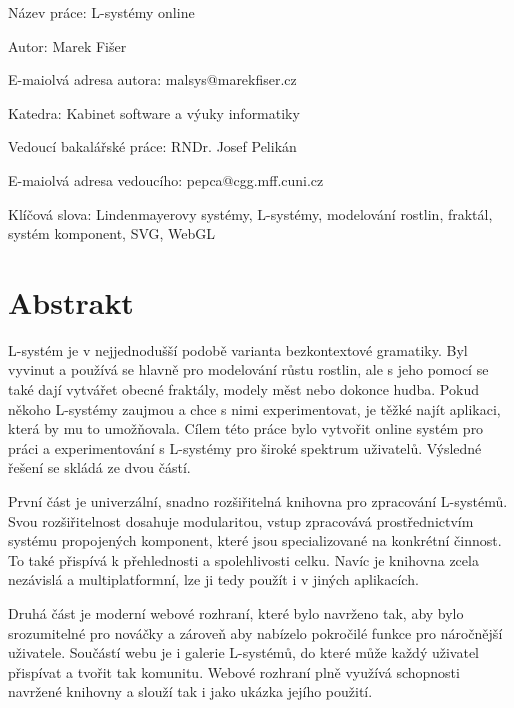 %
{%
\setlength\parindent{0mm}%
\setlength\parskip{5mm}%
Název práce: L-systémy online

Autor: Marek Fišer

E-maiolvá adresa autora: malsys@marekfiser.cz

Katedra: Kabinet software a výuky informatiky

Vedoucí bakalářské práce: RNDr. Josef Pelikán

E-maiolvá adresa vedoucího: pepca@cgg.mff.cuni.cz

Klíčová slova: Lindenmayerovy systémy, L-systémy, modelování rostlin, fraktál, systém komponent, SVG, WebGL

\section*{Abstrakt}
}
\mbox{L-systém} je v nejjednodušší podobě varianta bezkontextové gramatiky.
Byl vyvi\-nut a používá se hlavně pro modelování růstu rostlin, ale s jeho pomocí se také dají vytvářet obecné fraktály, modely měst nebo dokonce hudba.
Pokud někoho \mbox{L-systémy} zaujmou a chce s nimi experimentovat, je těžké najít aplikaci, která by mu to umožňovala.
Cílem této práce bylo vytvořit online systém pro práci a experimentování s L-systémy pro široké spektrum uživatelů.
Výsledné řešení se skládá ze dvou částí.

První část je univerzální, snadno rozšiřitelná knihovna pro zpracování \mbox{L-sys}\-témů.
Svou rozšiřitelnost dosahuje modularitou, vstup zpracovává pros\-třednic\-tvím systému propojených komponent, které jsou specializované na kon\-krét\-ní činnost.
To také přispívá k přehlednosti a spolehlivosti celku.
Navíc je knihovna zcela nezávislá a multiplatformní, lze ji tedy použít i v jiných aplikacích.

Druhá část je moderní webové rozhraní, které bylo navrženo tak, aby bylo srozumitelné pro nováčky a zároveň aby nabízelo pokročilé funkce pro nároč\-nější uživatele.
Součástí webu je i galerie L-systémů, do které může každý uživatel přispívat a tvořit tak komunitu.
Webové rozhraní plně využívá schopnosti navr\-žené knihovny a slouží tak i jako ukázka jejího použití.

